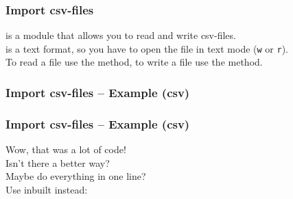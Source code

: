 \documentclass{beamer}
\begin{document}
%   
\begin{frame}
  \frametitle{Import csv-files}
  \texttt{} is a module that allows you to read and write csv-files.\\
  \vspace{5mm}
  \texttt{} is a text format, so you have to open the file in text mode (\texttt{w} or \texttt{r}).\\
  \vspace{5mm}
  To read a file use the \texttt{} method, to write a file use the \texttt{} method.
\end{frame}
\begin{frame}
  \frametitle{Import csv-files -- Example (csv)}
  
\end{frame}
\begin{frame}
  \frametitle{Import csv-files -- Example (csv)}
  Wow, that was a lot of code!\\
  Isn't there a better way?\\
  \vspace{5mm}
  Maybe do everything in one line?\\
  \vspace{5mm}
  Use  inbuilt  instead:
  
\end{frame}
\end{document}
